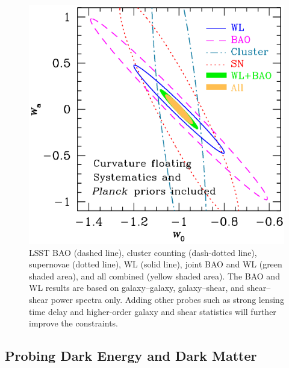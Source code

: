 \documentclass{emulateapj}
\begin{document}
\begin{figure}
\includegraphics[width=1.0\hsize,clip]{cswb.pdf}
\caption{
LSST BAO (dashed line), cluster counting (dash-dotted line), 
supernovae (dotted line), WL (solid line), joint BAO and WL 
(green shaded area), and all combined (yellow shaded area).
The BAO and WL results are based on galaxy--galaxy, galaxy--shear,
and shear--shear power spectra only. 
Adding other probes such as strong lensing time delay
and higher-order galaxy and shear statistics will further improve 
the constraints.} 
\label{Fig:DEellipses}
\end{figure}


\vskip 0.3in
\subsection{ Probing Dark Energy and Dark Matter }
\end{document}
